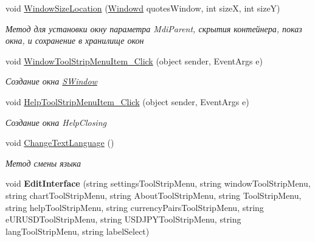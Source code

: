 \begin{DoxyCompactItemize}
void \hyperlink{class_client_1_1_main_form_a9356e4f0bb6127a253382090bdca5707}{Window\+Size\+Location} (\hyperlink{class_client_1_1_windowd}{Windowd} quotes\+Window, int sizeX, int sizeY)
\begin{DoxyCompactList}\small\item\em Метод для установки окну параметра Mdi\+Parent, скрытия контейнера, показ окна, и сохранение в хранилище окон \end{DoxyCompactList}\item 
void \hyperlink{class_client_1_1_main_form_a1c104c0cc622e2a763915c5d7500a515}{Window\+Tool\+Strip\+Menu\+Item\+\_\+\+Click} (object sender, Event\+Args e)
\begin{DoxyCompactList}\small\item\em Создание окна \hyperlink{class_client_1_1_s_window}{S\+Window} \end{DoxyCompactList}\item 
void \hyperlink{class_client_1_1_main_form_ae2d7d0d2a2ce5e8495d2e17e162e5506}{Help\+Tool\+Strip\+Menu\+Item\+\_\+\+Click} (object sender, Event\+Args e)
\begin{DoxyCompactList}\small\item\em Создание окна Help\+Closing \end{DoxyCompactList}\item 
void \hyperlink{class_client_1_1_main_form_a0d8831ab5fe970a2196b2ee35bf6508a}{Change\+Text\+Language} ()
\begin{DoxyCompactList}\small\item\em Метод смены языка \end{DoxyCompactList}\item 
\hypertarget{class_client_1_1_main_form_a5c23c1a74e8fc0090620434ee71ff10c}{}\label{class_client_1_1_main_form_a5c23c1a74e8fc0090620434ee71ff10c} 
void {\bfseries Edit\+Interface} (string settings\+Tool\+Strip\+Menu, string window\+Tool\+Strip\+Menu, string chart\+Tool\+Strip\+Menu, string About\+Tool\+Strip\+Menu, string Tool\+Strip\+Menu, string help\+Tool\+Strip\+Menu, string currency\+Pairs\+Tool\+Strip\+Menu, string e\+U\+R\+U\+S\+D\+Tool\+Strip\+Menu, string U\+S\+D\+J\+P\+Y\+Tool\+Strip\+Menu, string lang\+Tool\+Strip\+Menu, string label\+Select)
\end{DoxyCompactItemize}
